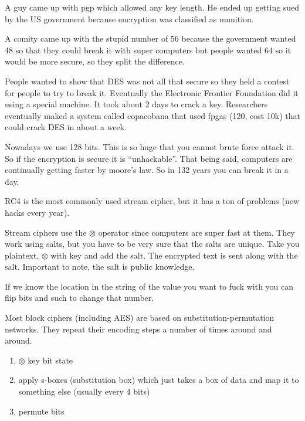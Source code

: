 \documentclass{article}
\begin{document}

A guy came up with pgp which allowed any key length. He ended up getting sued by the US government because encryption was classified as munition.


A comity came up with the stupid number of 56 because the government wanted 48 so that they could break it with super computers but people wanted 64 so it would be more secure, so they split the difference.


People wanted to show that DES was not all that secure so they held a contest for people to try to break it. Eventually the Electronic Frontier Foundation did it using a special machine. It took about 2 days to crack a key. Researchers eventually maked a system called copacobana that used fpgas (120, cost 10k) that could crack DES in about a week.


Nowadays we use 128 bits. This is so huge that you cannot brute force attack it. So if the encryption is secure it is ``unhackable''. That being said, computers are continually getting faster by moore's law. So in 132 years you can break it in a day.






RC4 is the most commonly used stream cipher, but it has a ton of problems (new hacks every year).


Stream ciphers use the $\otimes$ operator since computers are super fast at them. They work using salts, but you have to be very sure that the salts are unique. Take you plaintext, $\otimes$ with key and add the salt. The encrypted text is sent along with the salt. Important to note, the salt is public knowledge.


If we know the location in the string of the value you want to fuck with you can flip bits and such to change that number.

Most block ciphers (including AES) are based on substitution-permutation networks. They repeat their encoding steps a number of times around and around.
\begin{enumerate}
	\item $\otimes$ key bit state
	\item apply s-boxes (substitution box) which just takes a box of data and map it to something else (usually every 4 bits)
	\item permute bits
\end{enumerate}
\end{document}
